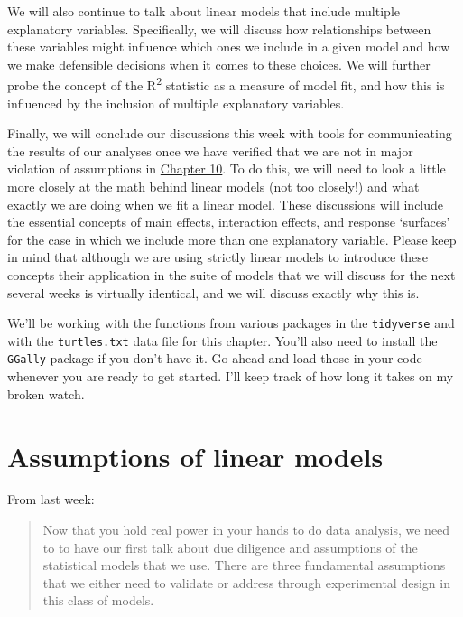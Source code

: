 \documentclass[
]{book}
\begin{document}
We will also continue to talk about linear models that include multiple explanatory variables. Specifically, we will discuss how relationships between these variables might influence which ones we include in a given model and how we make defensible decisions when it comes to these choices. We will further probe the concept of the R\textsuperscript{2} statistic as a measure of model fit, and how this is influenced by the inclusion of multiple explanatory variables.

Finally, we will conclude our discussions this week with tools for communicating the results of our analyses once we have verified that we are not in major violation of assumptions in \protect\hyperlink{Chapter10}{Chapter 10}. To do this, we will need to look a little more closely at the math behind linear models (not too closely!) and what exactly we are doing when we fit a linear model. These discussions will include the essential concepts of main effects, interaction effects, and response `surfaces' for the case in which we include more than one explanatory variable. Please keep in mind that although we are using strictly linear models to introduce these concepts their application in the suite of models that we will discuss for the next several weeks is virtually identical, and we will discuss exactly why this is.

We'll be working with the functions from various packages in the \texttt{tidyverse} and with the \texttt{turtles.txt} data file for this chapter. You'll also need to install the \texttt{GGally} package if you don't have it. Go ahead and load those in your code whenever you are ready to get started. I'll keep track of how long it takes on my broken watch.

\hypertarget{assumptions-of-linear-models}{%
\section{Assumptions of linear models}\label{assumptions-of-linear-models}}

From last week:

\begin{quote}
Now that you hold real power in your hands to do data analysis, we need to to have our first talk about due diligence and assumptions of the statistical models that we use.
There are three fundamental assumptions that we either need to validate or address through experimental design in this class of models.
\end{quote}
\end{document}
